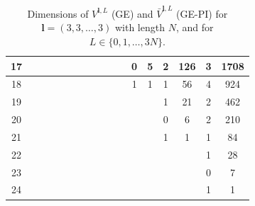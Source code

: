 \documentclass{article}
\newcommand{\bV}{{\bar V}}
\numberwithin{equation}{section}
\def\bl{{\bm l}}
\def\Nat{{N}}
\begin{document}
\begin{table}[htb!]
{\begin{tabular}{|c|cc|cc|cc|cc|cc|cc|cc|cc|}
17 & \multicolumn{1}{c|}{} &  & \multicolumn{1}{c|}{} &  & \multicolumn{1}{c|}{} &  & \multicolumn{1}{c|}{} &  & \multicolumn{1}{c|}{} &  & \multicolumn{1}{c|}{0} & 5 & \multicolumn{1}{c|}{2} & 126 & \multicolumn{1}{c|}{3} & 1708 \\ \hline
18 & \multicolumn{1}{c|}{} &  & \multicolumn{1}{c|}{} &  & \multicolumn{1}{c|}{} &  & \multicolumn{1}{c|}{} &  & \multicolumn{1}{c|}{} &  & \multicolumn{1}{c|}{1} & 1 & \multicolumn{1}{c|}{1} & 56 & \multicolumn{1}{c|}{4} & 924 \\ \hline
19 & \multicolumn{1}{c|}{} &  & \multicolumn{1}{c|}{} &  & \multicolumn{1}{c|}{} &  & \multicolumn{1}{c|}{} &  & \multicolumn{1}{c|}{} &  & \multicolumn{1}{c|}{} &  & \multicolumn{1}{c|}{1} & 21 & \multicolumn{1}{c|}{2} & 462 \\ \hline
20 & \multicolumn{1}{c|}{} &  & \multicolumn{1}{c|}{} &  & \multicolumn{1}{c|}{} &  & \multicolumn{1}{c|}{} &  & \multicolumn{1}{c|}{} &  & \multicolumn{1}{c|}{} &  & \multicolumn{1}{c|}{0} & 6 & \multicolumn{1}{c|}{2} & 210 \\ \hline
21 & \multicolumn{1}{c|}{} &  & \multicolumn{1}{c|}{} &  & \multicolumn{1}{c|}{} &  & \multicolumn{1}{c|}{} &  & \multicolumn{1}{c|}{} &  & \multicolumn{1}{c|}{} &  & \multicolumn{1}{c|}{1} & 1 & \multicolumn{1}{c|}{1} & 84 \\ \hline
22 & \multicolumn{1}{c|}{} &  & \multicolumn{1}{c|}{} &  & \multicolumn{1}{c|}{} &  & \multicolumn{1}{c|}{} &  & \multicolumn{1}{c|}{} &  & \multicolumn{1}{c|}{} &  & \multicolumn{1}{c|}{} &  & \multicolumn{1}{c|}{1} & 28 \\ \hline
23 & \multicolumn{1}{c|}{} &  & \multicolumn{1}{c|}{} &  & \multicolumn{1}{c|}{} &  & \multicolumn{1}{c|}{} &  & \multicolumn{1}{c|}{} &  & \multicolumn{1}{c|}{} &  & \multicolumn{1}{c|}{} &  & \multicolumn{1}{c|}{0} & 7 \\ \hline
24 & \multicolumn{1}{c|}{} &  & \multicolumn{1}{c|}{} &  & \multicolumn{1}{c|}{} &  & \multicolumn{1}{c|}{} &  & \multicolumn{1}{c|}{} &  & \multicolumn{1}{c|}{} &  & \multicolumn{1}{c|}{} &  & \multicolumn{1}{c|}{1} & 1 \\ \hline
\end{tabular}%
}
\caption{Dimensions of $V^{\bl,L}$ (GE) and $\bV^{\bl,L}$ (GE-PI) for $\bl = (3,3,\ldots,3)$ with length $\Nat$, and for $L\in\{0,1,\ldots,3\Nat\}$.}
\label{tab:l3}
\end{table}
\end{document}
